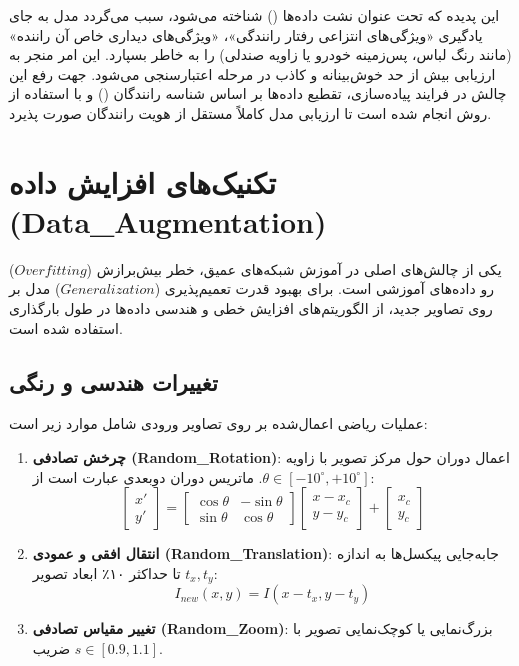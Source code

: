 \documentclass{report}
\begin{document}
 	این پدیده که تحت عنوان نشت داده‌ها () شناخته می‌شود، سبب می‌گردد مدل به جای یادگیری «ویژگی‌های انتزاعی رفتار رانندگی»، «ویژگی‌های دیداری خاص آن راننده» (مانند رنگ لباس، پس‌زمینه خودرو یا زاویه صندلی) را به خاطر بسپارد. این امر منجر به ارزیابی بیش از حد خوش‌بینانه و کاذب در مرحله اعتبارسنجی می‌شود. جهت رفع این چالش در فرایند پیاده‌سازی، تقطیع داده‌ها بر اساس شناسه رانندگان () و با استفاده از روش  انجام شده است تا ارزیابی مدل کاملاً مستقل از هویت رانندگان صورت پذیرد.
 	
 	
 	
 	
 	
 	\section{تکنیک‌های افزایش داده (Data\_Augmentation)}
 	یکی از چالش‌های اصلی در آموزش شبکه‌های عمیق، خطر بیش‌برازش ($Overfitting$) رو داده‌های آموزشی است. برای بهبود قدرت تعمیم‌پذیری ($Generalization$) مدل بر روی تصاویر جدید، از الگوریتم‌های افزایش خطی و هندسی داده‌ها در طول بارگذاری استفاده شده است.
 	
 	\subsection{تغییرات هندسی و رنگی}
 	عملیات ریاضی اعمال‌شده بر روی تصاویر ورودی شامل موارد زیر است:
 	
 	\begin{enumerate}
 		\item \textbf{چرخش تصادفی (Random\_Rotation)}: اعمال دوران حول مرکز تصویر با زاویه $\theta \in [-10^\circ, +10^\circ]$. ماتریس دوران دوبعدی عبارت است از:
 		\begin{equation}
 			\begin{bmatrix} x' \\ y' \end{bmatrix} = \begin{bmatrix} \cos\theta & -\sin\theta \\ \sin\theta & \cos\theta \end{bmatrix} \begin{bmatrix} x - x_c \\ y - y_c \end{bmatrix} + \begin{bmatrix} x_c \\ y_c \end{bmatrix}
 		\end{equation}
 		
 		\item \textbf{انتقال افقی و عمودی (Random\_Translation)}: جابه‌جایی پیکسل‌ها به اندازه $t_x, t_y$ تا حداکثر ۱۰٪ ابعاد تصویر:
 		\begin{equation}
 			I_{new}(x, y) = I(x - t_x, y - t_y)
 		\end{equation}
 		
 		\item \textbf{تغییر مقیاس تصادفی (Random\_Zoom)}: بزرگ‌نمایی یا کوچک‌نمایی تصویر با ضریب $s \in [0.9, 1.1]$.
 	\end{enumerate}
 	
\end{document}
